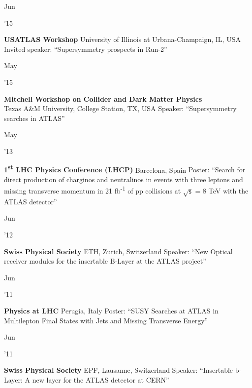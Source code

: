 \documentclass[]{cv} %
\begin{document}
\begin{entrylist}
  \entry
  {\parbox[t]{\parboxWidthOne}{Jun}\parbox[t]{\parboxWidthTwo}{\hfill '15}}
  {\textbf{USATLAS Workshop}}
  {University of Illinois at Urbana-Champaign, IL, USA}
  {Invited speaker: ``Supersymmetry prospects in Run-2''}

  \entry
  {\parbox[t]{\parboxWidthOne}{May}\parbox[t]{\parboxWidthTwo}{\hfill '15}}
  {\textbf{Mitchell Workshop on Collider and Dark Matter Physics}\\}
  {Texas A\&M University, College Station, TX, USA}
  {Speaker: ``Supersymmetry searches in ATLAS''}

  \entry
  {\parbox[t]{\parboxWidthOne}{May}\parbox[t]{\parboxWidthTwo}{\hfill '13}}
  {\textbf{1\textsuperscript{st} LHC Physics Conference (LHCP)}}
  {Barcelona, Spain}
  {Poster: ``Search for direct production of charginos and neutralinos in events with three
    leptons and missing transverse momentum in 21 fb\textsuperscript{-1} of pp collisions at $\sqrt{\mathsf{s}}$ = 8 TeV with the ATLAS
  detector''}

  \entry
  {\parbox[t]{\parboxWidthOne}{Jun}\parbox[t]{\parboxWidthTwo}{\hfill '12}}
  {\textbf{Swiss Physical Society}}
  {ETH, Zurich, Switzerland}
  {Speaker: ``New Optical receiver modules for the insertable B-Layer at the ATLAS project''}

  \entry
  {\parbox[t]{\parboxWidthOne}{Jun}\parbox[t]{\parboxWidthTwo}{\hfill '11}}
  {\textbf{Physics at LHC}}
  {Perugia, Italy}
  {Poster: ``SUSY Searches at ATLAS in Multilepton Final States with Jets and Missing Transverse Energy''}

  \entry
  {\parbox[t]{\parboxWidthOne}{Jun}\parbox[t]{\parboxWidthTwo}{\hfill '11}}
  {\textbf{Swiss Physical Society}}
  {EPF, Lausanne, Switzerland}
  {Speaker: ``Insertable b-Layer: A new layer for the ATLAS detector at CERN''}

\end{entrylist}
\end{document}
